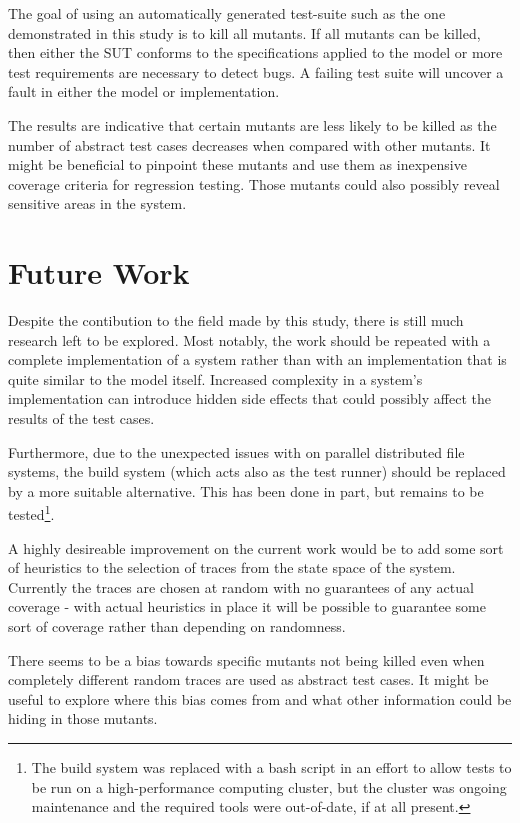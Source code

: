 \documentclass{article}
\begin{document}
		The goal of using an automatically generated test-suite such as the one demonstrated in this study is to kill all mutants. If all mutants can be killed, then either the SUT conforms to the specifications applied to the model or more test requirements are necessary to detect bugs. A failing test suite will uncover a fault in either the model or implementation.

		The results are indicative that certain mutants are less likely to be killed as the number of abstract test cases decreases when compared with other mutants. It might be beneficial to pinpoint these mutants and use them as inexpensive coverage criteria for regression testing. Those mutants could also possibly reveal sensitive areas in the system.

	\section{Future Work}
		Despite the contibution to the field made by this study, there is still much research left to be explored. Most notably, the work should be repeated with a complete implementation of a system rather than with an implementation that is quite similar to the model itself. Increased complexity in a system's implementation can introduce hidden side effects that could possibly affect the results of the test cases.

		Furthermore, due to the unexpected issues with \citeauthor{sbt} on parallel distributed file systems, the build system (which acts also as the test runner) should be replaced by a more suitable alternative. This has been done in part, but remains to be tested\footnote{The build system was replaced with a bash script in an effort to allow tests to be run on a high-performance computing cluster, but the cluster was ongoing maintenance and the required tools were out-of-date, if at all present.}.

		A highly desireable improvement on the current work would be to add some sort of heuristics to the selection of traces from the state space of the system. Currently the traces are chosen at random with no guarantees of any actual coverage \-- with actual heuristics in place it will be possible to guarantee some sort of coverage rather than depending on randomness.

		There seems to be a bias towards specific mutants not being killed even when completely different random traces are used as abstract test cases. It might be useful to explore where this bias comes from and what other information could be hiding in those mutants.
\end{document}
